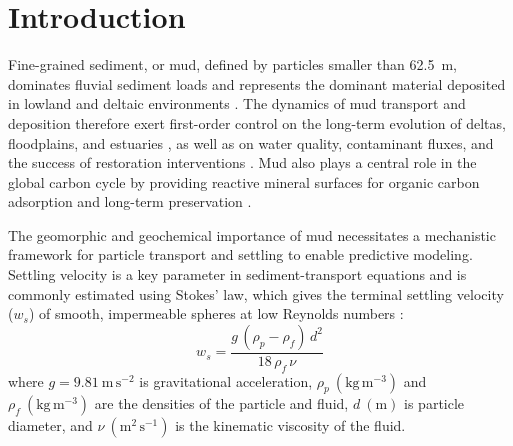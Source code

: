 \documentclass{agujournal2019}
\begin{document}
%
%
%
%


\section{Introduction}

Fine-grained sediment, or mud, defined by particles smaller than 62.5~\textmu m, dominates fluvial sediment loads and represents the dominant material deposited in lowland and deltaic environments \cite{healy2002muddy, kranenburg1994fractal, lamb2020mud, nghiem2026flocculated}. The dynamics of mud transport and deposition therefore exert first-order control on the long-term evolution of deltas, floodplains, and estuaries \cite{nghiem2022mechanistic, winterwerp2002flocculation}, as well as on water quality, contaminant fluxes, and the success of restoration interventions \cite{droppo1997freshwater, esposito2017efficient, kemp2016enhancing, liss1996floc}. Mud also plays a central role in the global carbon cycle by providing reactive mineral surfaces for organic carbon adsorption and long-term preservation \cite{bianchi2024anthropogenic, blair2012fate}.

The geomorphic and geochemical importance of mud necessitates a mechanistic framework for particle transport and settling to enable predictive modeling. Settling velocity is a key parameter in sediment-transport equations and is commonly estimated using Stokes’ law, which gives the terminal settling velocity ($w_s$) of smooth, impermeable spheres at low Reynolds numbers \cite{bird2006transport, stokes1851effect}:
\begin{equation}
w_s = \frac{g\,(\rho_p - \rho_f)\,d^2}{18\,\rho_f\,\nu}
    \label{eq:stokes}
\end{equation}
where $g = 9.81\ \mathrm{m\,s^{-2}}$ is gravitational acceleration, $\rho_p\ (\mathrm{kg\,m^{-3}})$ and $\rho_f\ (\mathrm{kg\,m^{-3}})$ are the densities of the particle and fluid, $d\ (\mathrm{m})$ is particle diameter, and $\nu\ (\mathrm{m^2\,s^{-1}})$ is the kinematic viscosity of the fluid. 
\end{document}
